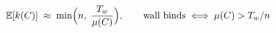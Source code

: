\documentclass[border=2pt]{standalone}
\begin{document}
$\displaystyle \mathbb{E}[k(C)] \;\approx\; \min\Bigl(n,\; \frac{T_w}{\mu(C)}\Bigr), \qquad \text{wall binds} \iff \mu(C) > T_w / n$
\end{document}
